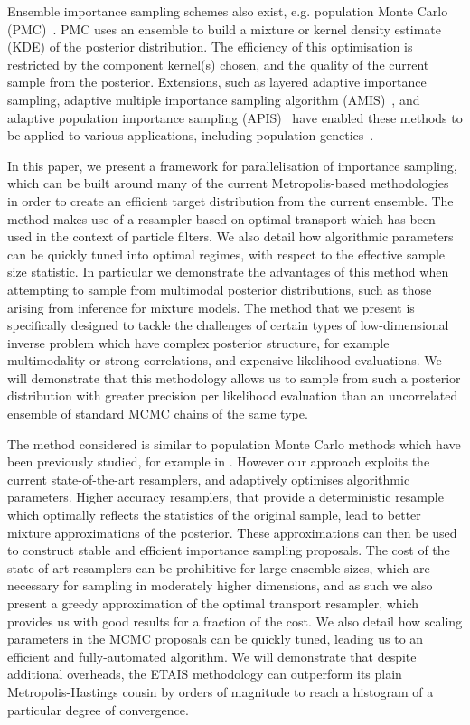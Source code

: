 \documentclass[final]{siamltex}
\begin{document}
Ensemble importance sampling schemes also exist, e.g. population Monte Carlo (PMC)~\cite{cappe2012population}. PMC uses an ensemble to build a mixture or kernel density estimate (KDE) of the
posterior distribution. The efficiency of
this optimisation is restricted by the component kernel(s) chosen, and
the quality of the current sample from the posterior\cite{cappe2008adaptive,douc2007convergence,douc2007minimum}. Extensions, such
as layered adaptive importance sampling\cite{martino2017layered}, adaptive multiple importance sampling algorithm
(AMIS)~\cite{cornuet2012adaptive}, and adaptive population importance sampling
(APIS)~\cite{martino2015adaptive} have enabled these methods to be
applied to various applications, including population
genetics~\cite{siren2011reconstructing}.

In this paper, we present a framework for parallelisation of
importance sampling, which can be built around many of the current
Metropolis-based methodologies in order to create an efficient target
distribution from the current
ensemble. The method makes use of a resampler based on optimal
transport which has been used in the context of particle
filters\cite{reich2013nonparametric}. We also detail how algorithmic
parameters can be quickly tuned into optimal regimes, with respect to
the effective sample size statistic. In particular we demonstrate the
advantages of this method when attempting to sample from multimodal
posterior distributions, such as those arising from inference for
mixture models. The method that we present is specifically designed to
tackle the challenges of certain types of low-dimensional inverse
problem which have complex posterior structure, for example
multimodality or strong correlations, and expensive
likelihood evaluations. We will demonstrate that this methodology
allows us to sample from such a posterior distribution with greater
precision per likelihood evaluation than an uncorrelated ensemble of
standard MCMC chains of the same type.

The method considered is similar to population Monte Carlo methods
which have been previously studied, for example in
\cite{elvira2017improving}. However our approach exploits the current
state-of-the-art resamplers, and adaptively optimises algorithmic parameters. Higher accuracy resamplers, that provide
a deterministic resample which optimally reflects the statistics of
the original sample, lead to better mixture approximations of the
posterior. These approximations can then be used to construct stable
and efficient importance sampling proposals. The cost of the
state-of-art resamplers can be prohibitive for large ensemble sizes,
which are necessary for sampling in moderately higher dimensions, and
as such we also present a greedy approximation of the optimal
transport resampler, which provides us with good results for a
fraction of the cost. We also detail how scaling parameters in the
MCMC proposals can be quickly tuned, leading us to an efficient and
fully-automated algorithm. We will demonstrate that despite additional
overheads, the ETAIS methodology can outperform its plain
Metropolis-Hastings cousin by orders of magnitude to reach a histogram
of a particular degree of convergence.
\end{document}
